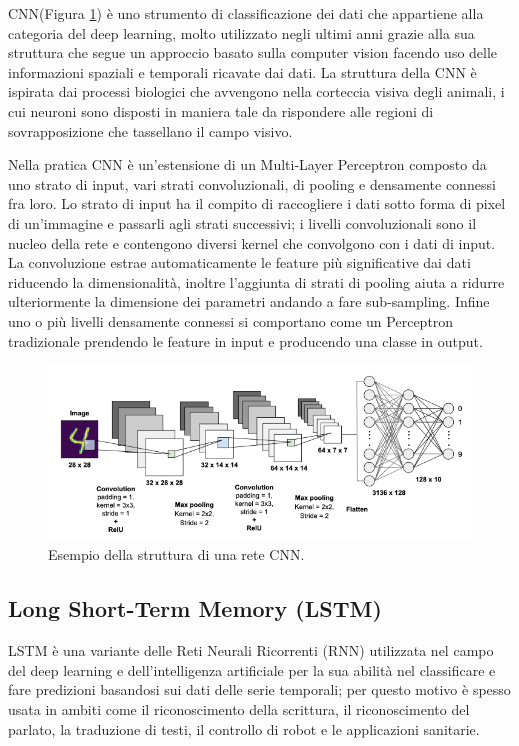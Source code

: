 CNN(Figura \ref{fig:cnn}) è uno strumento di classificazione dei dati che appartiene alla categoria del deep learning, molto utilizzato negli ultimi anni grazie alla sua struttura che segue un approccio basato sulla computer vision facendo uso delle informazioni spaziali e temporali ricavate dai dati. La struttura della CNN è ispirata dai processi biologici che avvengono nella corteccia visiva degli animali, i cui neuroni sono disposti in maniera tale da rispondere alle regioni di sovrapposizione che tassellano il campo visivo.

Nella pratica CNN è un'estensione di un Multi-Layer Perceptron composto da uno strato di input, vari strati convoluzionali, di pooling e densamente connessi fra loro. Lo strato di input ha il compito di raccogliere i dati sotto forma di pixel di un'immagine e passarli agli strati successivi; i livelli convoluzionali sono il nucleo della rete e contengono diversi kernel che convolgono con i dati di input. La convoluzione estrae automaticamente le feature più significative dai dati riducendo la dimensionalità, inoltre l'aggiunta di strati di pooling aiuta a ridurre ulteriormente la dimensione dei parametri andando a fare sub-sampling. Infine uno o più livelli densamente connessi si comportano come un Perceptron tradizionale prendendo le feature in input e producendo una classe in output.

\begin{figure}[!htb]
    \centering
    \includegraphics[width=\textwidth]{figure/cnn.png}
    \caption{Esempio della struttura di una rete CNN.}
    \label{fig:cnn}
\end{figure}

\subsection{Long Short-Term Memory (LSTM)}
\label{ssec:long-short-term-memory}

LSTM è una variante delle Reti Neurali Ricorrenti (RNN) utilizzata nel campo del deep learning e dell'intelligenza artificiale per la sua abilità nel classificare e fare predizioni basandosi sui dati delle serie temporali; per questo motivo è spesso usata in ambiti come il riconoscimento della scrittura, il riconoscimento del parlato, la traduzione di testi, il controllo di robot e le applicazioni sanitarie.

